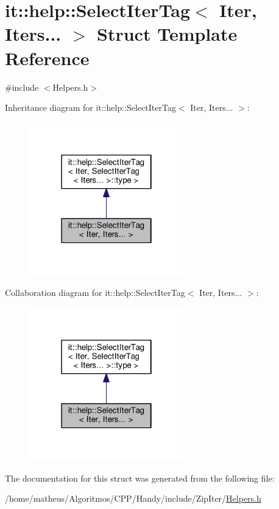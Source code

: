 \hypertarget{structit_1_1help_1_1SelectIterTag_3_01Iter_00_01Iters_8_8_8_01_4}{}\section{it\+:\+:help\+:\+:Select\+Iter\+Tag$<$ Iter, Iters... $>$ Struct Template Reference}
\label{structit_1_1help_1_1SelectIterTag_3_01Iter_00_01Iters_8_8_8_01_4}


{\ttfamily \#include $<$Helpers.\+h$>$}



Inheritance diagram for it\+:\+:help\+:\+:Select\+Iter\+Tag$<$ Iter, Iters... $>$\+:\nopagebreak
\begin{figure}[H]
\begin{center}
\leavevmode
\includegraphics[width=190pt]{structit_1_1help_1_1SelectIterTag_3_01Iter_00_01Iters_8_8_8_01_4__inherit__graph}
\end{center}
\end{figure}


Collaboration diagram for it\+:\+:help\+:\+:Select\+Iter\+Tag$<$ Iter, Iters... $>$\+:\nopagebreak
\begin{figure}[H]
\begin{center}
\leavevmode
\includegraphics[width=190pt]{structit_1_1help_1_1SelectIterTag_3_01Iter_00_01Iters_8_8_8_01_4__coll__graph}
\end{center}
\end{figure}


The documentation for this struct was generated from the following file\+:\begin{DoxyCompactItemize}
\item 
/home/matheus/\+Algoritmos/\+C\+P\+P/\+Handy/include/\+Zip\+Iter/\hyperlink{ZipIter_2Helpers_8h}{Helpers.\+h}\end{DoxyCompactItemize}
